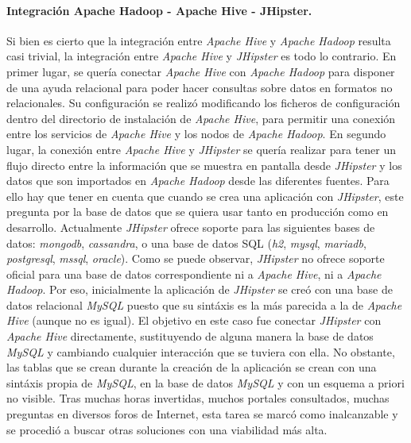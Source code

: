 \paragraph*{Integración Apache Hadoop - Apache Hive - JHipster.}

\par
Si bien es cierto que la integración entre \textit{Apache Hive} y \textit{Apache Hadoop} resulta casi trivial, la integración entre \textit{Apache Hive} y \textit{JHipster} es todo lo contrario. En primer lugar, se quería conectar \textit{Apache Hive} con \textit{Apache Hadoop} para disponer de una ayuda relacional para poder hacer consultas sobre datos en formatos no relacionales. Su configuración se realizó modificando los ficheros de configuración dentro del directorio de instalación de \textit{Apache Hive}, para permitir una conexión entre los servicios de \textit{Apache Hive} y los nodos de \textit{Apache Hadoop}. En segundo lugar, la conexión entre \textit{Apache Hive} y \textit{JHipster} se quería realizar para tener un flujo directo entre la información que se muestra en pantalla desde \textit{JHipster} y los datos que son importados en \textit{Apache Hadoop} desde las diferentes fuentes. Para ello hay que tener en cuenta que cuando se crea una aplicación con \textit{JHipster}, este pregunta por la base de datos que se quiera usar tanto en producción como en desarrollo. Actualmente \textit{JHipster} ofrece soporte para las siguientes bases de datos: \textit{\gls{mongodb}}, \textit{\gls{cassandra}}, o una base de datos SQL (\textit{\gls{h2}}, \textit{\gls{mysql}}, \textit{\gls{mariadb}}, \textit{\gls{postgresql}}, \textit{\gls{mssql}}, \textit{\gls{oracle}}).
Como se puede observar, \textit{JHipster} no ofrece soporte oficial para una base de datos correspondiente ni a \textit{Apache Hive}, ni a \textit{Apache Hadoop}. Por eso, inicialmente la aplicación de \textit{JHipster} se creó con una base de datos relacional \textit{MySQL} puesto que su sintáxis es la más parecida a la de \textit{Apache Hive} (aunque no es igual). El objetivo en este caso fue conectar \textit{JHipster} con \textit{Apache Hive} directamente, sustituyendo de alguna manera la base de datos \textit{MySQL} y cambiando cualquier interacción que se tuviera con ella. No obstante, las tablas que se crean durante la creación de la aplicación se crean con una sintáxis propia de \textit{MySQL}, en la base de datos \textit{MySQL} y con un esquema a priori no visible. Tras muchas horas invertidas, muchos portales consultados, muchas preguntas en diversos foros de Internet, esta tarea se marcó como inalcanzable y se procedió a buscar otras soluciones con una viabilidad más alta. 


